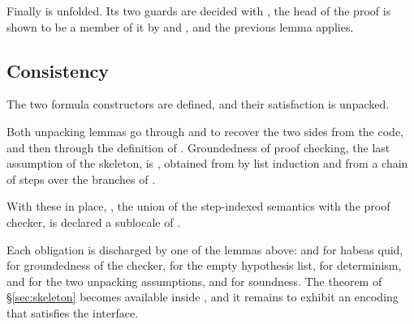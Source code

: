
\noindent
Finally  is unfolded.  Its two guards are decided with
, the head of the proof is shown to be a member of it by
 and , and the previous lemma applies.


\subsection{Consistency}
\label{sec:consistency}

The two formula constructors are defined, and their satisfaction is unpacked.


\noindent
Both unpacking lemmas go through  and  to
recover the two sides from the code, and then through the definition of
.  Groundedness of proof checking, the last assumption of the
skeleton, is , obtained from  by
list induction and from a chain of  steps over the branches of
.

With these in place, , the union of the step-indexed semantics
with the proof checker, is declared a sublocale of .


\noindent
Each obligation is discharged by one of the lemmas above:
 and  for habeas quid,
 for groundedness of the checker,
 for the empty hypothesis list,
 for determinism,
 and  for the two unpacking
assumptions, and  for soundness.  The theorem
 of \S\ref{sec:skeleton} becomes available
inside , and it remains to exhibit an encoding that satisfies
the interface.
